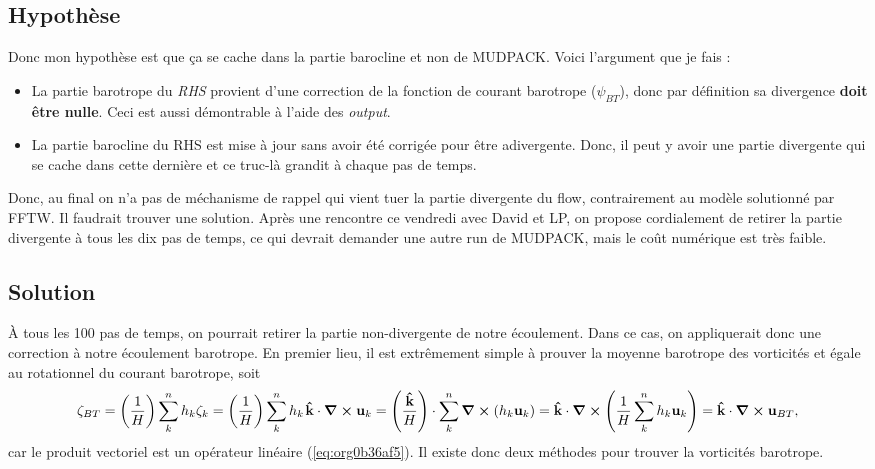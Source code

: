 \documentclass[10pt]{article}
\numberwithin{equation}{section}
\newcommand{\kvf}{\vb{\hat{k}}}
\newcommand{\uu}{\vb{u}}
\newcommand{\pt}{\hspace{1pt}} %
\begin{document}
\subsection{Hypothèse}
\label{sec:org4e432b2}
Donc mon hypothèse est que ça se cache dans la partie barocline et non de MUDPACK.
Voici l'argument que je fais :
\begin{itemize}
\item La partie barotrope du \emph{RHS} provient d'une correction de la fonction de courant barotrope (\(\psi_{BT}\)), donc par définition sa divergence \textbf{doit être nulle}. Ceci est aussi démontrable à l'aide des \emph{output}.
\item La partie barocline du RHS est mise à jour sans avoir été corrigée pour être adivergente.
Donc, il peut y avoir une partie divergente qui se cache dans cette dernière et ce truc-là grandit à chaque pas de temps.
\end{itemize}

Donc, au final on n'a pas de méchanisme de rappel qui vient tuer la partie divergente du flow, contrairement au modèle solutionné par FFTW.
Il faudrait trouver une solution.
Après une rencontre ce vendredi avec David et LP, on propose cordialement de retirer la partie divergente à tous les dix pas de temps, ce qui devrait demander une autre run de MUDPACK, mais le coût numérique est très faible.

\subsection{Solution}
\label{sec:org5e50a5f}

À tous les 100 pas de temps, on pourrait retirer la partie non-divergente de notre écoulement.
Dans ce cas, on appliquerait donc une correction à notre écoulement barotrope.
En premier lieu, il est extrêmement simple à prouver la moyenne barotrope des vorticités et égale au rotationnel du courant barotrope, soit
\begin{equation}
\label{eq:org0b36af5}
   \zeta_{BT} = \qty(\frac{1}{H})\sum_k^n h_k\zeta_k = \qty(\frac{1}{H})\sum_k^n h_k\pt \kvf \cdot \curl{\uu_k} = \qty(\frac{ \kvf}{H})\cdot\sum_k^n\curl(h_k\uu_k) = \kvf\cdot\curl(\frac{1}{H}\sum_k^n h_k\uu_k) = \kvf\cdot\curl{\uu_{BT}},
\end{equation}
car le produit vectoriel est un opérateur linéaire (\ref{eq:org0b36af5}).
Il existe donc deux méthodes pour trouver la vorticités barotrope.\bigskip
\end{document}
